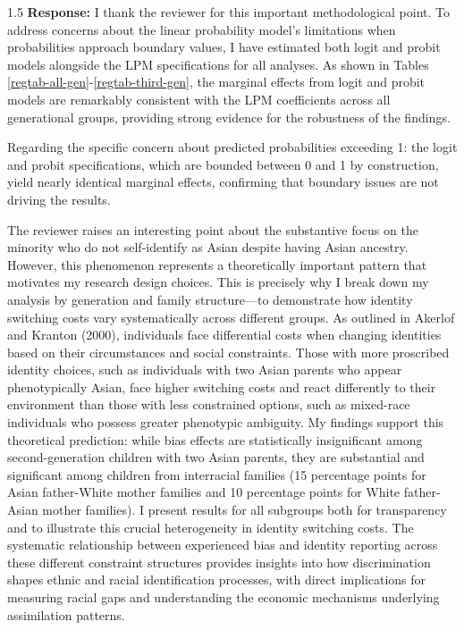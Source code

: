 \documentclass[12pt,english]{article}
\newcommand{\rrxspc}{1.5}
\begin{document}
\begin{refsection}
        \begin{spacing}{\rrxspc}
            \textbf{Response:} I thank the reviewer for this important methodological point. To address concerns about the linear probability model's limitations when probabilities approach boundary values, I have estimated both logit and probit models alongside the LPM specifications for all analyses. As shown in Tables \ref{regtab-all-gen}-\ref{regtab-third-gen}, the marginal effects from logit and probit models are remarkably consistent with the LPM coefficients across all generational groups, providing strong evidence for the robustness of the findings.

            Regarding the specific concern about predicted probabilities exceeding 1: the logit and probit specifications, which are bounded between 0 and 1 by construction, yield nearly identical marginal effects, confirming that boundary issues are not driving the results.

            The reviewer raises an interesting point about the substantive focus on the minority who do not self-identify as Asian despite having Asian ancestry. However, this phenomenon represents a theoretically important pattern that motivates my research design choices. This is precisely why I break down my analysis by generation and family structure—to demonstrate how identity switching costs vary systematically across different groups. As outlined in Akerlof and Kranton (2000), individuals face differential costs when changing identities based on their circumstances and social constraints. Those with more proscribed identity choices, such as individuals with two Asian parents who appear phenotypically Asian, face higher switching costs and react differently to their environment than those with less constrained options, such as mixed-race individuals who possess greater phenotypic ambiguity. My findings support this theoretical prediction: while bias effects are statistically insignificant among second-generation children with two Asian parents, they are substantial and significant among children from interracial families (15 percentage points for Asian father-White mother families and 10 percentage points for White father-Asian mother families). I present results for all subgroups both for transparency and to illustrate this crucial heterogeneity in identity switching costs. The systematic relationship between experienced bias and identity reporting across these different constraint structures provides insights into how discrimination shapes ethnic and racial identification processes, with direct implications for measuring racial gaps and understanding the economic mechanisms underlying assimilation patterns.



\end{spacing}
\end{refsection}
\end{document}
